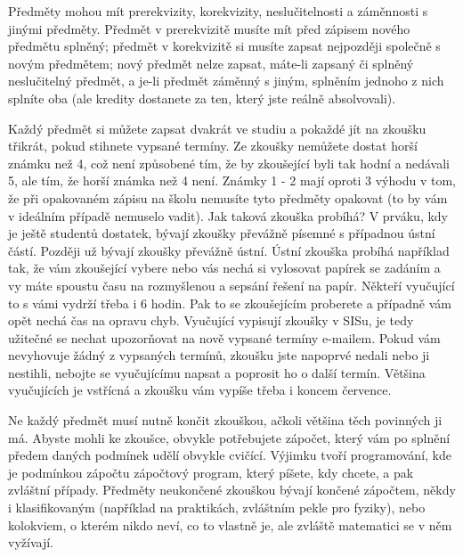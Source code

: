 Předměty mohou mít prerekvizity, korekvizity, neslučitelnosti a záměnnosti s
jinými předměty.
Předmět v prerekvizitě musíte mít před zápisem nového předmětu splněný; předmět
v korekvizitě si musíte zapsat nejpozději společně s novým předmětem; nový
předmět nelze zapsat, máte-li zapsaný či splněný neslučitelný předmět, a je-li
předmět záměnný s jiným, splněním jednoho z nich splníte oba (ale kredity
dostanete za ten, který jste reálně absolvovali).

Každý předmět si můžete zapsat dvakrát ve studiu a pokaždé jít na zkoušku
třikrát, pokud stihnete vypsané termíny.
Ze zkoušky nemůžete dostat horší známku než 4, což není způsobené tím, že by
zkoušející byli tak hodní a nedávali 5, ale tím, že horší známka než 4 není.
Známky 1 - 2 mají oproti 3 výhodu v tom, že při opakovaném zápisu na školu
nemusíte tyto předměty opakovat (to by vám v ideálním případě nemuselo vadit).
Jak taková zkouška probíhá? V prváku, kdy je ještě studentů dostatek, bývají
zkoušky převážně písemné s případnou ústní částí. Později už bývají zkoušky
převážně ústní. Ústní zkouška probíhá například tak, že vám zkoušející vybere
nebo vás nechá si vylosovat papírek se zadáním a vy máte spoustu času na
rozmyšlenou a sepsání řešení na papír. Někteří vyučující to s vámi vydrží třeba
i 6 hodin. Pak to se zkoušejícím proberete a případně vám opět nechá čas na
opravu chyb.
Vyučující vypisují zkoušky v SISu, je tedy užitečné se nechat upozorňovat na
nově vypsané termíny e-mailem. Pokud vám nevyhovuje žádný z vypsaných termínů,
zkoušku jste napoprvé nedali nebo ji nestihli, nebojte se vyučujícímu napsat a
poprosit ho o další termín. Většina vyučujících je vstřícná a zkoušku vám vypíše
třeba i koncem července.

Ne každý předmět musí nutně končit zkouškou, ačkoli většina těch povinných ji
má. Abyste mohli ke zkoušce, obvykle potřebujete zápočet, který vám po splnění
předem daných podmínek udělí obvykle cvičící. Výjimku tvoří programování, kde je
podmínkou zápočtu zápočtový program, který píšete, kdy chcete, a pak zvláštní
případy. Předměty neukončené zkouškou bývají končené zápočtem, někdy i
klasifikovaným (například na praktikách, zvláštním pekle pro fyziky), nebo
kolokviem, o kterém nikdo neví, co to vlastně je, ale zvláště matematici se v
něm vyžívají.

